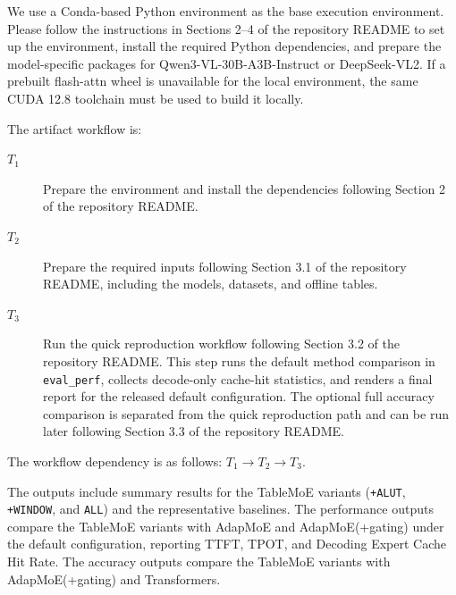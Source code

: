 \documentclass[conference]{IEEEtran}
\begin{document}

We use a Conda-based Python environment as the base execution environment.
Please follow the instructions in Sections 2--4 of the repository README to
set up the environment, install the required Python dependencies, and prepare
the model-specific packages for Qwen3-VL-30B-A3B-Instruct or DeepSeek-VL2. If
a prebuilt flash-attn wheel is unavailable for the local environment, the same
CUDA 12.8 toolchain must be used to build it locally.

\artcomp

The artifact workflow is:
\begin{description}
\item[$T_1$] Prepare the environment and install the dependencies following
Section 2 of the repository README.
\item[$T_2$] Prepare the required inputs following Section 3.1 of the
repository README, including the models, datasets, and offline tables.
\item[$T_3$] Run the quick reproduction workflow following Section 3.2 of the
repository README. This step runs the default method comparison in
\texttt{eval\_perf}, collects decode-only cache-hit statistics, and renders a
final report for the released default configuration. The optional full
accuracy comparison is separated from the quick reproduction path and can be
run later following Section 3.3 of the repository README.
\end{description}

The workflow dependency is as follows:
$T_1 \rightarrow T_2 \rightarrow T_3$.

\artout

The outputs include summary results for the TableMoE variants
(\texttt{+ALUT}, \texttt{+WINDOW}, and \texttt{ALL}) and the representative
baselines. The performance outputs compare the TableMoE variants with AdapMoE
and AdapMoE(+gating) under the default configuration, reporting TTFT, TPOT,
and Decoding Expert Cache Hit Rate. The accuracy outputs compare the TableMoE
variants with AdapMoE(+gating) and Transformers.
\end{document}
